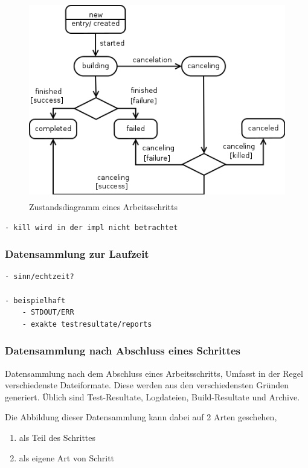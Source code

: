 \begin{figure}[ht] 
  \centering
  \label{fig:lebenszyklus-arbeitsschritt}
  \includegraphics[height=3.4in]{imageinput/lebenszyklus-arbeitsschritt.png}
  \caption{Zustandsdiagramm eines Arbeitsschritts}
\end{figure}

\begin{verbatim}
- kill wird in der impl nicht betrachtet

\end{verbatim}


\subsubsection{Datensammlung zur Laufzeit}

\begin{verbatim}
- sinn/echtzeit?

- beispielhaft
    - STDOUT/ERR
    - exakte testresultate/reports
\end{verbatim}



\subsubsection{Datensammlung nach Abschluss eines Schrittes}

Datensammlung nach dem Abschluss eines Arbeitsschritts,
Umfasst in der Regel verschiedenste Dateiformate.
Diese werden aus den verschiedensten Gründen generiert.
Üblich sind Test-Resultate, Logdateien, Build-Resultate und Archive.

Die Abbildung dieser Datensammlung kann dabei auf 2 Arten geschehen,

\begin{enumerate}
    \item als Teil des Schrittes
    \item als eigene Art von Schritt
\end{enumerate}

